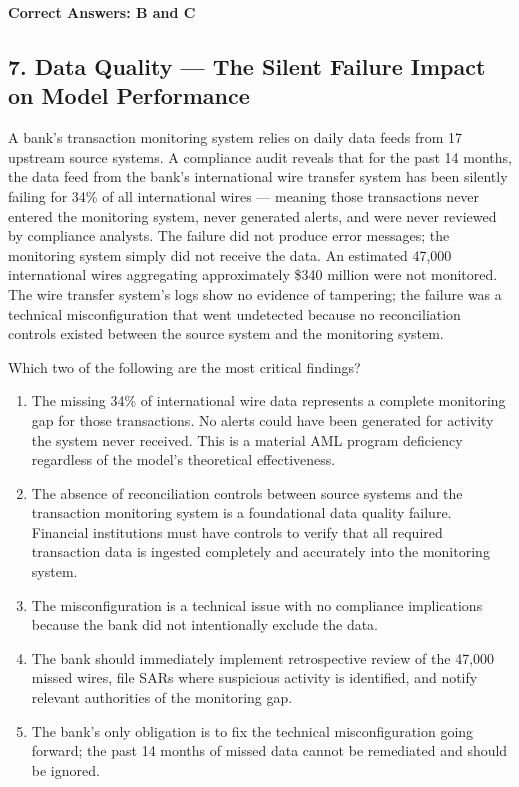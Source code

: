 \documentclass[11pt,a4paper]{article}
\begin{document}
	\textbf{Correct Answers: B and C}
	
	\subsection{7. Data Quality — The Silent Failure Impact on Model Performance}
	
	A bank's transaction monitoring system relies on daily data feeds from 17 upstream source systems. A compliance audit reveals that for the past 14 months, the data feed from the bank's international wire transfer system has been silently failing for 34\% of all international wires — meaning those transactions never entered the monitoring system, never generated alerts, and were never reviewed by compliance analysts. The failure did not produce error messages; the monitoring system simply did not receive the data. An estimated 47,000 international wires aggregating approximately \$340 million were not monitored. The wire transfer system's logs show no evidence of tampering; the failure was a technical misconfiguration that went undetected because no reconciliation controls existed between the source system and the monitoring system.
	
	Which two of the following are the most critical findings?
	
	\begin{enumerate}[label=\Alph*.]
		\item The missing 34\% of international wire data represents a complete monitoring gap for those transactions. No alerts could have been generated for activity the system never received. This is a material AML program deficiency regardless of the model's theoretical effectiveness.
		\item The absence of reconciliation controls between source systems and the transaction monitoring system is a foundational data quality failure. Financial institutions must have controls to verify that all required transaction data is ingested completely and accurately into the monitoring system.
		\item The misconfiguration is a technical issue with no compliance implications because the bank did not intentionally exclude the data.
		\item The bank should immediately implement retrospective review of the 47,000 missed wires, file SARs where suspicious activity is identified, and notify relevant authorities of the monitoring gap.
		\item The bank's only obligation is to fix the technical misconfiguration going forward; the past 14 months of missed data cannot be remediated and should be ignored.
	\end{enumerate}
	
\end{document}
